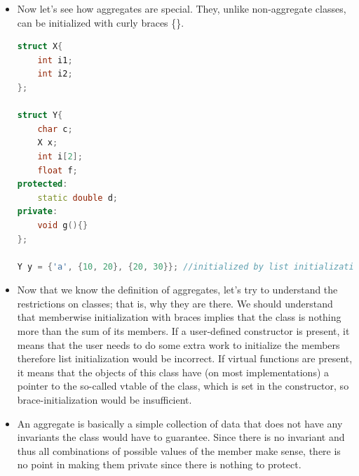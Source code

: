 \documentclass[a4paper,11pt,twoside]{book}
\begin{document}
\begin{itemize}
	\item Now let's see how aggregates are special. They, unlike non-aggregate classes, can be initialized with curly braces \{\}. 
\begin{lstlisting}[frame=single, language=c++]
struct X{
	int i1;
	int i2;
};
	
struct Y{
	char c;
	X x;
	int i[2];
	float f; 
protected:
	static double d;
private:
	void g(){}      
}; 
	
Y y = {'a', {10, 20}, {20, 30}}; //initialized by list initialization, f is 0
\end{lstlisting}
	
	\item Now that we know the definition of aggregates, let's try to understand the restrictions on classes; that is, why they are there. We should understand that memberwise initialization with braces implies that the class is nothing more than the sum of its members. If a user-defined constructor is present, it means that the user needs to do some extra work to initialize the members therefore list initialization would be incorrect. If virtual functions are present, it means that the objects of this class have (on most implementations) a pointer to the so-called vtable of the class, which is set in the constructor, so brace-initialization would be insufficient. 
	
	\item An aggregate is basically a simple collection of data that does not have any invariants the class would have to guarantee. Since there is no invariant and thus all combinations of possible values of the member make sense, there is no point in making them private since there is nothing to protect.
	
\end{itemize}
\end{document}
